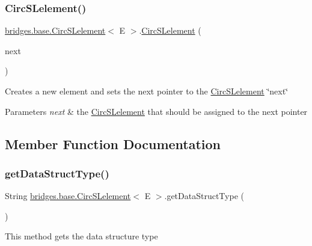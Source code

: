 \subsubsection{\texorpdfstring{Circ\+S\+Lelement()}{CircSLelement()}\hspace{0.1cm}{\footnotesize\ttfamily [4/4]}}
{\footnotesize\ttfamily \hyperlink{classbridges_1_1base_1_1_circ_s_lelement}{bridges.\+base.\+Circ\+S\+Lelement}$<$ E $>$.\hyperlink{classbridges_1_1base_1_1_circ_s_lelement}{Circ\+S\+Lelement} (\begin{DoxyParamCaption}\item[{\hyperlink{classbridges_1_1base_1_1_circ_s_lelement}{Circ\+S\+Lelement}$<$ E $>$}]{next }\end{DoxyParamCaption})}

Creates a new element and sets the next pointer to the \hyperlink{classbridges_1_1base_1_1_circ_s_lelement}{Circ\+S\+Lelement} \char`\"{}next\char`\"{}


\begin{DoxyParams}{Parameters}
{\em next} & the \hyperlink{classbridges_1_1base_1_1_circ_s_lelement}{Circ\+S\+Lelement} that should be assigned to the next pointer \\
\hline
\end{DoxyParams}


\subsection{Member Function Documentation}
\mbox{\label{classbridges_1_1base_1_1_circ_s_lelement_ad56acddc52e8e0b6869a6f24f1e0a90e}} 
\subsubsection{\texorpdfstring{get\+Data\+Struct\+Type()}{getDataStructType()}}
{\footnotesize\ttfamily String \hyperlink{classbridges_1_1base_1_1_circ_s_lelement}{bridges.\+base.\+Circ\+S\+Lelement}$<$ E $>$.get\+Data\+Struct\+Type (\begin{DoxyParamCaption}{ }\end{DoxyParamCaption})}

This method gets the data structure type

